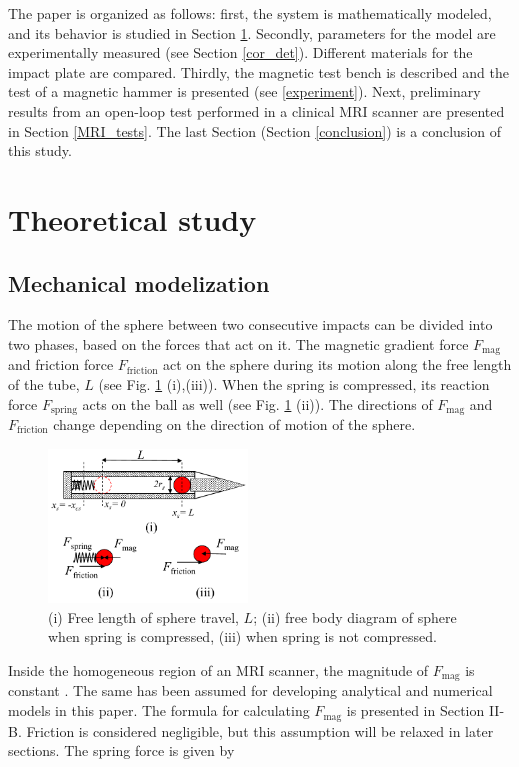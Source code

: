 \documentclass[letterpaper, 10 pt, conference]{ieeeconf}  %
\begin{document}
The paper is organized as follows: first, the system is mathematically modeled, and its behavior is studied in Section \ref{theoretical}. Secondly, parameters for the model are experimentally measured (see Section \ref{cor_det}). Different materials for the impact plate are compared. Thirdly, the magnetic test bench is described and the test of a magnetic hammer is presented (see \cref{experiment}). Next, preliminary results from an open-loop test performed in a clinical MRI scanner are presented in Section \ref{MRI_tests}. The last Section (Section \ref{conclusion}) is a conclusion of this study.


\section{Theoretical study}
\label{theoretical}
\subsection{Mechanical modelization}
The motion of the sphere between two consecutive impacts can be divided into two  phases, based on the forces that act on it. The magnetic gradient force $F_{\textrm{mag}}$ and friction force $F_{\textrm{friction}}$ act on the sphere during its motion along the free length of the tube, $L$ (see Fig. \ref{FBD} (i),(iii)). When the spring is compressed, its reaction force $F_{\textrm{spring}}$ acts on the ball as well (see Fig. \ref{FBD} (ii)). The directions of $F_{\textrm{mag}}$ and $F_{\textrm{friction}}$  change depending on the direction of motion of the sphere. 
\begin{figure}
	\begin{centering}
	\includegraphics[width=150pt]{FBD_R1.pdf}
	\caption{(i) Free length of sphere travel, $L$; (ii) free body diagram of sphere when spring is compressed, (iii) when spring is not compressed.}
	\label{FBD}
	\end{centering}
	\end{figure}
Inside the homogeneous region of an MRI scanner, the magnitude of $F_{\textrm{mag}}$ is constant \cite{CMR:CMR20163}. The same has been assumed for developing analytical and numerical models in this paper. The formula for calculating $F_{\textrm{mag}}$ is presented in Section II-B. Friction is considered negligible, but this assumption will be relaxed in later sections. The spring force is given by
\end{document}
